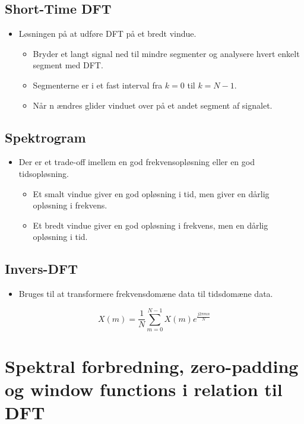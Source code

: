 \documentclass[danish]{article}
\begin{document}
\subsection{Short-Time DFT} 
\begin{itemize}
	\item Løsningen på at udføre DFT på et bredt vindue.
­	\begin{itemize}
	\item Bryder et langt signal ned til mindre segmenter og analysere hvert enkelt segment med DFT.
­	\item Segmenterne er i et fast interval fra $k = 0$ til $k = N-1$.
­	\item Når n ændres glider vinduet over på et andet segment af signalet. 
\end{itemize}
\end{itemize}

\subsection{Spektrogram}
\begin{itemize}
	\item Der er et trade-off imellem en god frekvensopløsning eller en god tidsopløsning. 
­	\begin{itemize}
		\item Et smalt vindue giver en god opløsning i tid, men giver en dårlig opløsning i frekvens. 
­		\item Et bredt vindue giver en god opløsning i frekvens, men en dårlig opløsning i tid. 
	\end{itemize}
\end{itemize}

\subsection{Invers-DFT}
\begin{itemize}
	\item Bruges til at transformere frekvensdomæne data til tidsdomæne data.
\end{itemize}

\begin{equation}
X(m)=\frac{1}{N}\sum_{m=0}^{N-1}X(m)e^{\frac{j2\pi mn}{N}}
\end{equation}



\newpage
\section{Spektral forbredning, zero-padding og window functions i relation til DFT}
\newpage
\end{document}
